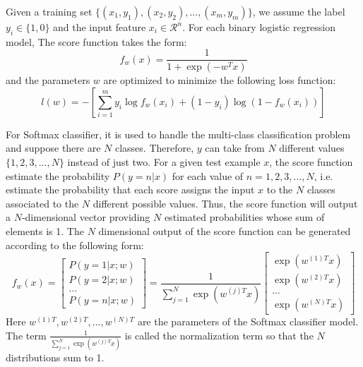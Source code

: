 Given a training set $\{(x_1,y_1),(x_2,y_2),...,(x_m,y_m)\}$, we assume the label $y_i \in \{1,0\}$ and the input feature $x_i \in \mathcal{R}^n$. For each binary logistic regression model, The score function takes the form:
\begin{equation}
{f_w}(x) = \frac{1}{{1 + \exp ( - {w^T}x)}}
\end{equation}
and the parameters $w$ are optimized to minimize the following loss function:
\begin{equation}
l(w) =  - [\sum\limits_{i = 1}^m {{y_i}\log {f_w}({x_i}) + (1 - {y_i})} \log (1 - {f_w}({x_i}))]\label{eq:logistic:loss}
\end{equation}

For Softmax classifier, it is used to handle the multi-class classification problem and suppose there are $N$ classes. Therefore, $y$ can take from $N$ different values $\{1,2,3,...,N\}$ instead of just two. For a given test example $x$, the score function estimate the probability $P(y=n|x)$ for each value of $n = 1,2,3,...,N$, i.e. estimate the probability that each score assigns the input $x$ to the $N$ classes associated to the $N$ different possible values. Thus, the score function will output a $N$-dimensional vector providing $N$ estimated probabilities whose sum of elements is 1. The $N$ dimensional output of the score function can be generated according to the following form:
\begin{equation}
{f_w}\left( x \right) = \left[ \begin{array}{l}
P\left( {y = 1|x;w} \right)\\
P\left( {y = 2|x;w} \right)\\
...\\
P\left( {y = n|x;w} \right)
\end{array} \right] = \frac{1}{{\sum\nolimits_{j = 1}^N {\exp \left( {{w^{(j)T}}x} \right)} }}\left[ \begin{array}{l}
\exp \left( {{w^{(1)T}}x} \right)\\
\exp \left( {{w^{(2)T}}x} \right)\\
...\\
\exp \left( {{w^{(N)T}}x} \right)
\end{array} \right]
\end{equation}
Here $w^{(1)T},w^{({2})T},...,w^{({N})T}$ are the parameters of the Softmax classifier model. The term $\frac{1}{{\sum\nolimits_{j = 1}^N {\exp \left( {{w^{(j)T}}x} \right)} }}$ is called the normalization term so that the $N$ distributions sum to 1.

